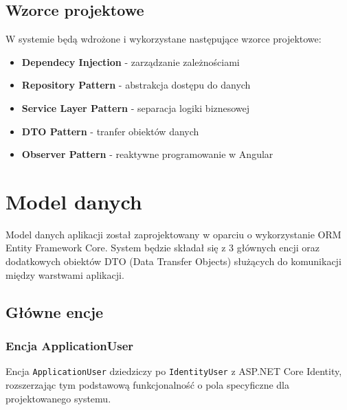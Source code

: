 \subsection{Wzorce projektowe}
W systemie będą wdrożone i wykorzystane następujące wzorce projektowe:
\begin{itemize}
	\item \textbf{Dependecy Injection} - zarządzanie zależnościami
	\item \textbf{Repository Pattern} - abstrakcja dostępu do danych
	\item \textbf{Service Layer Pattern} - separacja logiki biznesowej
	\item \textbf{DTO Pattern} - tranfer obiektów danych
	\item \textbf{Observer Pattern} - reaktywne programowanie w Angular
\end{itemize}

\section{Model danych}
Model danych aplikacji został zaprojektowany w oparciu o wykorzystanie ORM Entity Framework Core. System będzie składał się z 3 głównych encji oraz dodatkowych obiektów DTO (Data Transfer Objects) służących do komunikacji między warstwami aplikacji.

\subsection{Główne encje}

\subsubsection{Encja ApplicationUser}
Encja \texttt{ApplicationUser} dziedziczy po \texttt{IdentityUser} z ASP.NET Core Identity, rozszerzając tym podstawową funkcjonalność o pola specyficzne dla projektowanego systemu.

